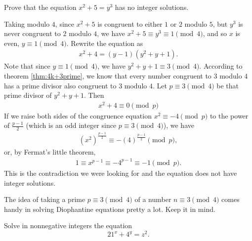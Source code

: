 \documentclass{subfile}
\begin{document}
				\begin{problem}
					Prove that the equation $x^2+5=y^3$ has no integer solutions.
				\end{problem}
				
				\begin{solution}
					Taking modulo $4$, since $x^2+5$ is congruent to either $1$ or $2$ modulo $5$, but $y^3$ is never congruent to $2$ modulo $4$, we have $x^2 + 5 \equiv y^3 \equiv 1 \pmod 4$, and so $x$ is even, $y \equiv 1 \pmod 4$. Rewrite the equation as
						\begin{align*}
							x^2+4 = (y-1)(y^2+y+1).
						\end{align*}
					Note that since $y \equiv 1 \pmod 4$, we have $y^2+y+1 \equiv 3 \pmod 4$. According to theorem \eqref{thm:4k+3prime}, we know that every number congruent to $3$ modulo $4$ has a prime divisor also congruent to $3$ modulo $4$. Let $p \equiv 3 \pmod 4$ be that prime divisor of $y^2+y+1$. Then
						\begin{align*}
							x^2 + 4 \equiv 0 \pmod p
						\end{align*}
					If we raise both sides of the congruence equation $x^2 \equiv -4 \pmod p$ to the power of $\frac{p-1}{2}$ (which is an odd integer since $p \equiv 3 \pmod 4$), we have
						\begin{align*}
							\left(x^2\right)^{\frac{p-1}{2}} \equiv -\left(4\right)^{\frac{p-1}{2}} \pmod p,
						\end{align*}
					or, by Fermat's little theorem,
						\begin{align*}
							1 \equiv x^{p-1} \equiv -4^{p-1} \equiv -1 \pmod p.
						\end{align*}
					This is the contradiction we were looking for and the equation does not have integer solutions.
				\end{solution}
				
				\begin{note}
					The idea of taking a prime $p \equiv 3 \pmod 4$ of a number $n \equiv 3 \pmod 4$ comes handy in solving Diophantine equations pretty a lot. Keep it in mind.
				\end{note}
				
				\begin{problem}
					Solve in nonnegative integers the equation
					\[21^x+4^y=z^2.\]
				\end{problem}
				
\end{document}
